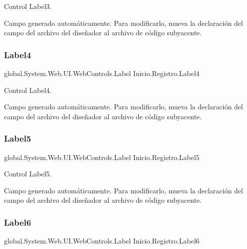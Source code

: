 Control Label3. 

Campo generado automáticamente. Para modificarlo, mueva la declaración del campo del archivo del diseñador al archivo de código subyacente. \mbox{\label{class_inicio_1_1_registro_a0cb8176c99e6ad87d5f77896e1aaf5d1}} 
\subsubsection{\texorpdfstring{Label4}{Label4}}
{\footnotesize\ttfamily global.\+System.\+Web.\+U\+I.\+Web\+Controls.\+Label Inicio.\+Registro.\+Label4\hspace{0.3cm}{\ttfamily [protected]}}



Control Label4. 

Campo generado automáticamente. Para modificarlo, mueva la declaración del campo del archivo del diseñador al archivo de código subyacente. \mbox{\label{class_inicio_1_1_registro_abe5ff1ad9dfeb25a9e673175b1aa828f}} 
\subsubsection{\texorpdfstring{Label5}{Label5}}
{\footnotesize\ttfamily global.\+System.\+Web.\+U\+I.\+Web\+Controls.\+Label Inicio.\+Registro.\+Label5\hspace{0.3cm}{\ttfamily [protected]}}



Control Label5. 

Campo generado automáticamente. Para modificarlo, mueva la declaración del campo del archivo del diseñador al archivo de código subyacente. \mbox{\label{class_inicio_1_1_registro_a1f4d81dd35af2a53cf1df120b4f9b383}} 
\subsubsection{\texorpdfstring{Label6}{Label6}}
{\footnotesize\ttfamily global.\+System.\+Web.\+U\+I.\+Web\+Controls.\+Label Inicio.\+Registro.\+Label6\hspace{0.3cm}{\ttfamily [protected]}}



